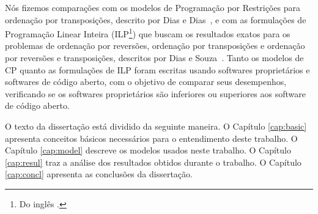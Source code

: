 Nós fizemos comparações com os modelos de Programação por Restrições
para ordenação por transposições, descrito por Dias e
Dias~\cite{DiasDias*2009}, e com as formulações de Programação Linear
Inteira (ILP\footnote{Do inglês .}) que
buscam os resultados exatos para os problemas de ordenação por
reversões, ordenação por transposições e ordenação por reversões e
transposições, descritos por Dias e Souza~\cite{DiasSouza*2007}.
Tanto os modelos de CP quanto as formulações de ILP foram escritas
usando softwares proprietários e softwares de código aberto, com o
objetivo de comparar seus desempenhos, verificando se os softwares
proprietários são inferiores ou superiores aos software de código
aberto.

O texto da dissertação está dividido da seguinte maneira. O
Capítulo \ref{cap:basic} apresenta conceitos básicos
necessários para o entendimento deste trabalho. O
Capítulo \ref{cap:model} descreve os modelos usados neste trabalho. O
Capítulo \ref{cap:resul} traz a análise dos resultados obtidos durante
o trabalho. O Capítulo \ref{cap:concl} apresenta as conclusões da
dissertação.

